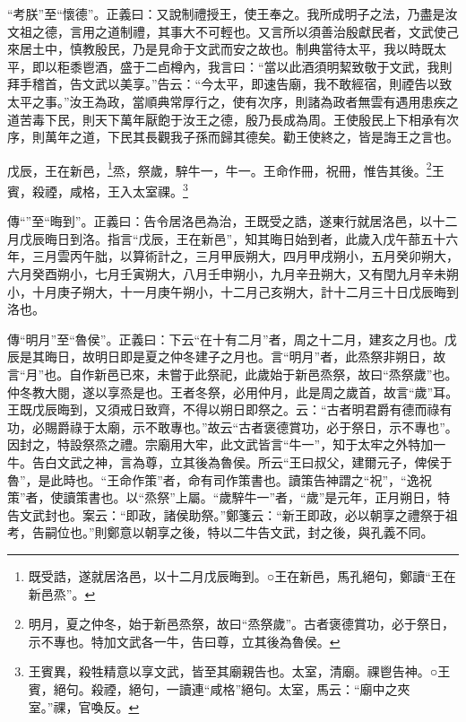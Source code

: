 {\noindent\shu{}\fzkt “考朕”至“懷德”。正義曰：又說制禮授王，使王奉之。我所成明子之法，乃盡是汝文祖之德，言用之道制禮，其事大不可輕也。又言所以須善治殷獻民者，文武使己來居土中，慎教殷民，乃是見命于文武而安之故也。制典當待太平，我以時既太平，即以秬黍鬯酒，盛于二卣樽內，我言曰：“當以此酒須明絜致敬于文武，我則拜手稽首，告文武以美享。”告云：“今太平，即速告廟，我不敢經宿，則禋告以致太平之事。”汝王為政，當順典常厚行之，使有次序，則諸為政者無雲有遇用患疾之道苦毒下民，則天下萬年厭飽于汝王之德，殷乃長成為周。王使殷民上下相承有次序，則萬年之道，下民其長觀我子孫而歸其德矣。勸王使終之，皆是誨王之言也。 \par}

戊辰，王在新邑，\footnote{既受誥，遂就居洛邑，以十二月戊辰晦到。○王在新邑，馬孔絕句，鄭讀“王在新邑烝”。}烝，祭歲，騂牛一，牛一。王命作冊，祝冊，惟告其後。\footnote{明月，夏之仲冬，始于新邑烝祭，故曰“烝祭歲”。古者褒德賞功，必于祭日，示不專也。特加文武各一牛，告曰尊，立其後為魯侯。}王賓，殺禋，咸格，王入太室祼。\footnote{王賓異，殺牲精意以享文武，皆至其廟親告也。太室，清廟。祼鬯告神。○王賓，絕句。殺禋，絕句，一讀連“咸格”絕句。太室，馬云：“廟中之夾室。”祼，官喚反。}


{\noindent\zhuan{}\fzbyks 傳“”至“晦到”。正義曰：告令居洛邑為治，王既受之誥，遂東行就居洛邑，以十二月戊辰晦日到洛。指言“戊辰，王在新邑”，知其晦日始到者，此歲入戊午蔀五十六年，三月雲丙午朏，以算術計之，三月甲辰朔大，四月甲戌朔小，五月癸卯朔大，六月癸酉朔小，七月壬寅朔大，八月壬申朔小，九月辛丑朔大，又有閏九月辛未朔小，十月庚子朔大，十一月庚午朔小，十二月己亥朔大，計十二月三十日戊辰晦到洛也。 \par}

{\noindent\zhuan{}\fzbyks 傳“明月”至“魯侯”。正義曰：下云“在十有二月”者，周之十二月，建亥之月也。戊辰是其晦日，故明日即是夏之仲冬建子之月也。言“明月”者，此烝祭非朔日，故言“月”也。自作新邑已來，未嘗于此祭祀，此歲始于新邑烝祭，故曰“烝祭歲”也。仲冬教大閱，遂以享烝是也。王者冬祭，必用仲月，此是周之歲首，故言“歲”耳。王既戊辰晦到，又須戒日致齊，不得以朔日即祭之。云：“古者明君爵有德而祿有功，必賜爵祿于太廟，示不敢專也。”故云“古者褒德賞功，必于祭日，示不專也”。因封之，特設祭烝之禮。宗廟用大牢，此文武皆言“牛一”，知于太牢之外特加一牛。告白文武之神，言為尊，立其後為魯侯。所云“王曰叔父，建爾元子，俾侯于魯”，是此時也。“王命作策”者，命有司作策書也。讀策告神謂之“祝”，“逸祝策”者，使讀策書也。以“烝祭”上屬。“歲騂牛一”者，“歲”是元年，正月朔日，特告文武封也。案云：“即政，諸侯助祭。”鄭箋云：“新王即政，必以朝享之禮祭于祖考，告嗣位也。”則鄭意以朝享之後，特以二牛告文武，封之後，與孔義不同。 \par}

